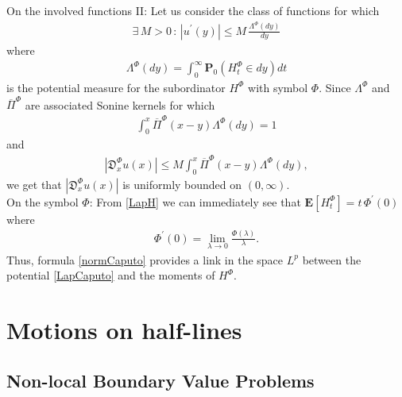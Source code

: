 \documentclass[11pt,a4paper]{article}
\theoremstyle{plain}
\theoremstyle{definition}
\theoremstyle{remark}
\begin{document}
	
	{\sc On the involved functions II:} Let us consider the class of functions for which
	\begin{align}
		\label{condMD}
		\exists\, M>0\,:\, | u^\prime(y) | \leq  M\, \frac{\Lambda^\Phi(dy)}{dy}
	\end{align} 
	where 
	\begin{align*}
		\Lambda^\Phi(dy) = \int_0^\infty \mathbf{P}_0(H_t^\Phi \in dy) dt
	\end{align*}
	is the potential measure for the subordinator $H^\Phi$ with symbol $\Phi$. Since $\Lambda^\Phi$ and $\overline{\Pi}^\Phi$ are associated Sonine kernels for which 
	\begin{align*}
		\int_0^x \overline{\Pi}^\Phi(x-y) \Lambda^\Phi(dy) =1
	\end{align*} 
	and
	\begin{align}
		| \mathfrak{D}^\Phi_x u(x)| \leq M \int_0^x \overline{\Pi}^\Phi(x-y) \Lambda^\Phi(dy),
	\end{align} 
	we get that $|\mathfrak{D}^\Phi_x u(x)|$ is uniformly bounded on $(0, \infty)$.\\
	
	
	
	
	{\sc On the symbol $\Phi$:} From \eqref{LapH} we can immediately see that $\mathbf{E}[H^\Phi_t] = t\, \Phi^\prime(0)$ where
	\begin{align}
		\Phi^\prime(0) = \lim_{\lambda \to 0} \frac{\Phi(\lambda)}{\lambda}.
		\label{PHIderivative}
	\end{align}
	Thus, formula \eqref{normCaputo} provides a link in the space $L^p$ between the potential \eqref{LapCaputo} and the moments of $H^\Phi$. 		
	
	
	
	
	
	
	
	\section{Motions on half-lines} 
	\label{sec:BC}
	
	\subsection{Non-local Boundary Value Problems}
	
\end{document}
